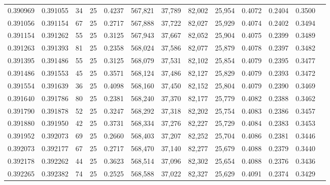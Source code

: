 \begin{tabular}{rrrrrrrrrrrrr}
0.390969 & 0.391055 &    34 &  25 &                                     0.4237 & 567,821 &  37,789 &  82,002 &  25,954 & 0.4072 & 0.2404 & 0.3500 \\
0.391056 & 0.391154 &    67 &  25 &                                     0.2717 & 567,888 &  37,722 &  82,027 &  25,929 & 0.4074 & 0.2402 & 0.3494 \\
0.391154 & 0.391262 &    55 &  25 &                                     0.3125 & 567,943 &  37,667 &  82,052 &  25,904 & 0.4075 & 0.2399 & 0.3489 \\
0.391263 & 0.391393 &    81 &  25 &                                     0.2358 & 568,024 &  37,586 &  82,077 &  25,879 & 0.4078 & 0.2397 & 0.3482 \\
0.391395 & 0.391486 &    55 &  25 &                                     0.3125 & 568,079 &  37,531 &  82,102 &  25,854 & 0.4079 & 0.2395 & 0.3477 \\
0.391486 & 0.391553 &    45 &  25 &                                     0.3571 & 568,124 &  37,486 &  82,127 &  25,829 & 0.4079 & 0.2393 & 0.3472 \\
0.391554 & 0.391639 &    36 &  25 &                                     0.4098 & 568,160 &  37,450 &  82,152 &  25,804 & 0.4079 & 0.2390 & 0.3469 \\
0.391640 & 0.391786 &    80 &  25 &                                     0.2381 & 568,240 &  37,370 &  82,177 &  25,779 & 0.4082 & 0.2388 & 0.3462 \\
0.391790 & 0.391878 &    52 &  25 &                                     0.3247 & 568,292 &  37,318 &  82,202 &  25,754 & 0.4083 & 0.2386 & 0.3457 \\
0.391880 & 0.391950 &    42 &  25 &                                     0.3731 & 568,334 &  37,276 &  82,227 &  25,729 & 0.4084 & 0.2383 & 0.3453 \\
0.391952 & 0.392073 &    69 &  25 &                                     0.2660 & 568,403 &  37,207 &  82,252 &  25,704 & 0.4086 & 0.2381 & 0.3446 \\
0.392073 & 0.392177 &    67 &  25 &                                     0.2717 & 568,470 &  37,140 &  82,277 &  25,679 & 0.4088 & 0.2379 & 0.3440 \\
0.392178 & 0.392262 &    44 &  25 &                                     0.3623 & 568,514 &  37,096 &  82,302 &  25,654 & 0.4088 & 0.2376 & 0.3436 \\
0.392265 & 0.392382 &    74 &  25 &                                     0.2525 & 568,588 &  37,022 &  82,327 &  25,629 & 0.4091 & 0.2374 & 0.3429 \\

\end{tabular}
